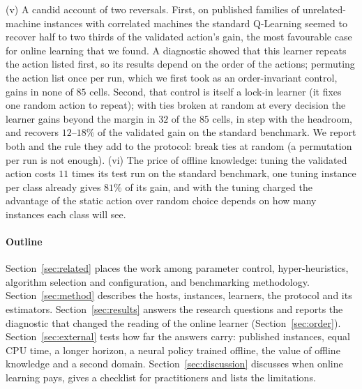 (v) A candid account of two reversals. First, on published families of unrelated-machine instances with correlated machines the standard Q-Learning seemed to recover half to two thirds of the validated action's gain, the most favourable case for online learning that we found. A diagnostic showed that this learner repeats the action listed first, so its results depend on the order of the actions; permuting the action list once per run, which we first took as an order-invariant control, gains in none of $85$ cells. Second, that control is itself a lock-in learner (it fixes one random action to repeat); with ties broken at random at every decision the learner gains beyond the margin in $32$ of the $85$ cells, in step with the headroom, and recovers $12$--$18\%$ of the validated gain on the standard benchmark. We report both and the rule they add to the protocol: break ties at random (a permutation per run is not enough).
(vi) The price of offline knowledge: tuning the validated action costs $11$ times its test run on the standard benchmark, one tuning instance per class already gives $81\%$ of its gain, and with the tuning charged the advantage of the static action over random choice depends on how many instances each class will see.

\paragraph{Outline} Section~\ref{sec:related} places the work among parameter control, hyper-heuristics, algorithm selection and configuration, and benchmarking methodology. Section~\ref{sec:method} describes the hosts, instances, learners, the protocol and its estimators. Section~\ref{sec:results} answers the research questions and reports the diagnostic that changed the reading of the online learner (Section~\ref{sec:order}). Section~\ref{sec:external} tests how far the answers carry: published instances, equal CPU time, a longer horizon, a neural policy trained offline, the value of offline knowledge and a second domain. Section~\ref{sec:discussion} discusses when online learning pays, gives a checklist for practitioners and lists the limitations.
